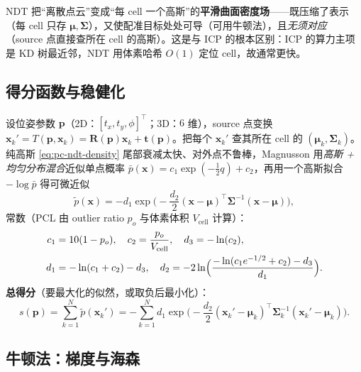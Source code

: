 \begin{insight}
NDT 把“离散点云”变成“每 cell 一个高斯”的\textbf{平滑曲面密度场}——既压缩了表示（每 cell 只存 $\boldsymbol{\mu},\boldsymbol{\Sigma}$），又使配准目标处处可导（可用牛顿法），且\emph{无须对应}（source 点直接查所在 cell 的高斯）。这是与 ICP 的根本区别：ICP 的算力主项是 KD 树最近邻，NDT 用体素哈希 $O(1)$ 定位 cell，故通常更快。
\end{insight}

\subsection{得分函数与稳健化}
\label{sec:pc-ndt-score}

\begin{derivation}
设位姿参数 $\mathbf{p}$（2D：$[t_x,t_y,\phi]^\top$；3D：$6$ 维），source 点变换 $\mathbf{x}_k'=T(\mathbf{p},\mathbf{x}_k)=\mathbf{R}(\mathbf{p})\mathbf{x}_k+\mathbf{t}(\mathbf{p})$。把每个 $\mathbf{x}_k'$ 查其所在 cell 的 $(\boldsymbol{\mu}_k,\boldsymbol{\Sigma}_k)$。纯高斯 \cref{eq:pc-ndt-density} 尾部衰减太快、对外点不鲁棒，Magnusson 用\emph{高斯 + 均匀分布混合}近似单点概率 $\bar p(\mathbf{x})=c_1\exp(-\tfrac12 q)+c_2$，再用一个高斯拟合 $-\log\bar p$ 得可微近似
\begin{equation}
  \tilde p(\mathbf{x})=-d_1\exp\!\Big(-\frac{d_2}{2}(\mathbf{x}-\boldsymbol{\mu})^\top\boldsymbol{\Sigma}^{-1}(\mathbf{x}-\boldsymbol{\mu})\Big),
  \label{eq:pc-ndt-robust}
\end{equation}
常数（PCL 由 outlier ratio $p_o$ 与体素体积 $V_{\text{cell}}$ 计算）：
\begin{align}
  c_1&=10(1-p_o),\quad c_2=\frac{p_o}{V_{\text{cell}}},\quad d_3=-\ln(c_2),\notag\\
  d_1&=-\ln(c_1+c_2)-d_3,\quad
  d_2=-2\ln\!\Big(\frac{-\ln(c_1 e^{-1/2}+c_2)-d_3}{d_1}\Big).
  \label{eq:pc-ndt-d12}
\end{align}
\textbf{总得分}（要最大化的似然，或取负后最小化）：
\begin{equation}
  s(\mathbf{p})=\sum_{k=1}^{N}\tilde p(\mathbf{x}_k')
  =-\sum_{k=1}^{N}d_1\exp\!\Big(-\frac{d_2}{2}(\mathbf{x}_k'-\boldsymbol{\mu}_k)^\top\boldsymbol{\Sigma}_k^{-1}(\mathbf{x}_k'-\boldsymbol{\mu}_k)\Big).
  \label{eq:pc-ndt-score}
\end{equation}
\end{derivation}

\subsection{牛顿法：梯度与海森}
\label{sec:pc-ndt-newton}

